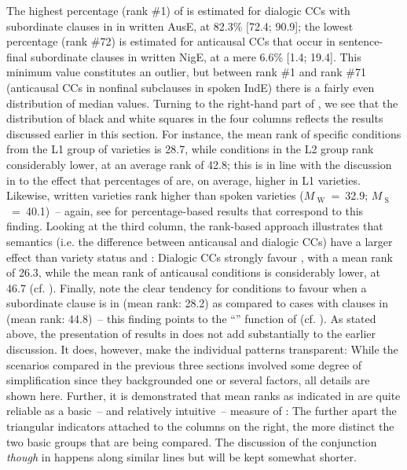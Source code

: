 The highest percentage (rank \#1) of  is estimated for dialogic CCs with subordinate clauses in  in written AusE, at 82.3\% [72.4; 90.9]; the lowest percentage (rank \#72) is estimated for anticausal CCs that occur in sentence-final subordinate clauses in written NigE, at a mere 6.6\% [1.4; 19.4]. This minimum value constitutes an outlier, but between rank \#1 and rank \#71 (anticausal CCs in nonfinal subclauses in spoken IndE) there is a fairly even distribution of median values. Turning to the right-hand part of , we see that the distribution of black and white squares in the four columns reflects the results discussed earlier in this section. For instance, the mean rank of specific conditions from the L1 group of varieties is 28.7, while conditions in the L2 group rank considerably lower, at an average rank of 42.8; this is in line with the discussion in  to the effect that percentages of  are, on average, higher in L1 varieties. Likewise, written varieties rank higher than spoken varieties ($M_{\text{~W}}$~=~32.9; $M_{\text{~S}}$~=~40.1)~– again, see  for percentage-based results that correspond to this finding. Looking at the third column, the rank-based approach illustrates that semantics (i.e. the difference between anticausal and dialogic CCs) have a larger effect than variety status and : Dialogic CCs strongly favour , with a mean rank of 26.3, while the mean rank of anticausal conditions is considerably lower, at 46.7 (cf. ). Finally, note the clear tendency for conditions to favour  when a subordinate clause is in  (mean rank: 28.2) as compared to cases with clauses in  (mean rank: 44.8)~– this finding points to the “” function of  (cf. ). As stated above, the presentation of results in  does not add substantially to the earlier discussion. It does, however, make the individual patterns transparent: While the scenarios compared in the previous three sections involved some degree of simplification since they backgrounded one or several factors, all details are shown here. Further, it is demonstrated that mean ranks as indicated in  are quite reliable as a basic~– and relatively intuitive~– measure of :  The further apart the triangular indicators attached to the columns on the right, the more distinct the two basic groups that are being compared. The discussion of the conjunction \textit{though} in  happens along similar lines but will be kept somewhat shorter.

